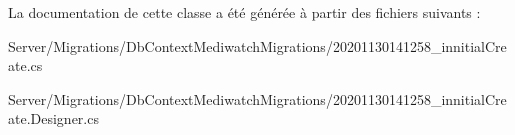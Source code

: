 La documentation de cette classe a été générée à partir des fichiers suivants \+:\begin{DoxyCompactItemize}
\item 
Server/\+Migrations/\+Db\+Context\+Mediwatch\+Migrations/20201130141258\+\_\+innitial\+Create.\+cs\item 
Server/\+Migrations/\+Db\+Context\+Mediwatch\+Migrations/20201130141258\+\_\+innitial\+Create.\+Designer.\+cs\end{DoxyCompactItemize}
